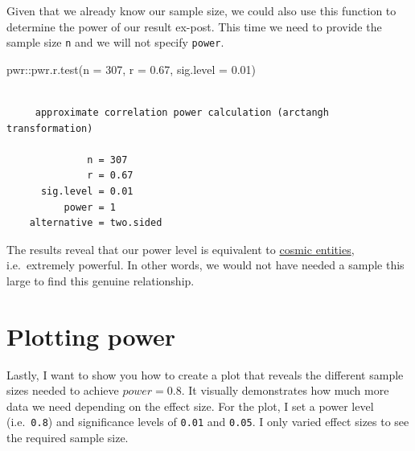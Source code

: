 \documentclass[
  letterpaper,
  DIV=11,
  numbers=noendperiod]{scrreprt}
\newenvironment{Shaded}{\begin{snugshade}}{\end{snugshade}}
\newcommand{\AttributeTok}[1]{\textcolor[rgb]{0.40,0.45,0.13}{#1}}
\newcommand{\DecValTok}[1]{\textcolor[rgb]{0.68,0.00,0.00}{#1}}
\newcommand{\FloatTok}[1]{\textcolor[rgb]{0.68,0.00,0.00}{#1}}
\newcommand{\FunctionTok}[1]{\textcolor[rgb]{0.28,0.35,0.67}{#1}}
\newcommand{\NormalTok}[1]{\textcolor[rgb]{0.00,0.23,0.31}{#1}}
\newcommand{\SpecialCharTok}[1]{\textcolor[rgb]{0.37,0.37,0.37}{#1}}
\begin{document}
Given that we already know our sample size, we could also use this
function to determine the power of our result ex-post. This time we need
to provide the sample size \texttt{n} and we will not specify
\texttt{power}.

\begin{Shaded}
\begin{Highlighting}[]
\NormalTok{pwr}\SpecialCharTok{::}\FunctionTok{pwr.r.test}\NormalTok{(}\AttributeTok{n =} \DecValTok{307}\NormalTok{,}
                \AttributeTok{r =} \FloatTok{0.67}\NormalTok{,}
                \AttributeTok{sig.level =} \FloatTok{0.01}\NormalTok{)}
\end{Highlighting}
\end{Shaded}

\begin{verbatim}

     approximate correlation power calculation (arctangh transformation) 

              n = 307
              r = 0.67
      sig.level = 0.01
          power = 1
    alternative = two.sided
\end{verbatim}

The results reveal that our power level is equivalent to
\href{https://marvelcinematicuniverse.fandom.com/wiki/Cosmic_Entities}{cosmic
entities}, i.e.~extremely powerful. In other words, we would not have
needed a sample this large to find this genuine relationship.

\section{Plotting power}\label{sec-plotting-power}

Lastly, I want to show you how to create a plot that reveals the
different sample sizes needed to achieve \(power = 0.8\). It visually
demonstrates how much more data we need depending on the effect size.
For the plot, I set a power level (i.e.~\texttt{0.8}) and significance
levels of \texttt{0.01} and \texttt{0.05}. I only varied effect sizes to
see the required sample size.
\end{document}
